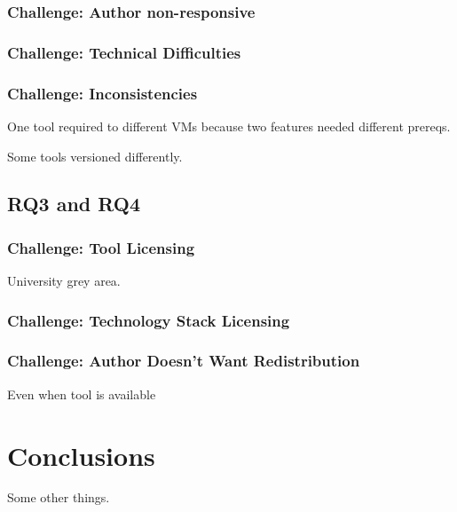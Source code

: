 \documentclass{sig-alternate-05-2015}
\begin{document}
\subsubsection{Challenge: Author non-responsive}


\subsubsection{Challenge: Technical Difficulties}

\subsubsection{Challenge: Inconsistencies}

One tool required to different VMs because two features needed different prereqs.

Some tools versioned differently.

\subsection{RQ3 and RQ4}


\subsubsection{Challenge: Tool Licensing}

University grey area.

\subsubsection{Challenge: Technology Stack Licensing}

\subsubsection{Challenge: Author Doesn't Want Redistribution}

Even when tool is available

\section{Conclusions}

Some other things.





\end{document}
